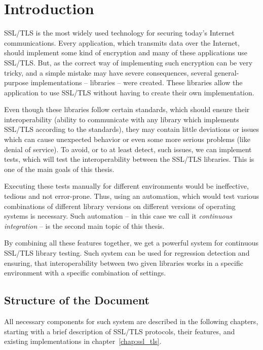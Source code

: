 
\chapter{Introduction}
    SSL/TLS is the most widely used technology for securing today's Internet communications.
    Every application, which transmits data over the Internet, should implement
    some kind of encryption and many of these applications use SSL/TLS. But, as
    the correct way of implementing such encryption can be very tricky, and
    a simple mistake may have severe consequences, several general-purpose
    implementations -- libraries -- were created. These libraries allow the
    application to use SSL/TLS without having to create their own implementation.

    Even though these libraries follow certain standards, which should ensure
    their interoperability (ability to communicate with any library which
    implements SSL/TLS according to the standards), they may contain little
    deviations or issues which can cause unexpected behavior or even some more
    serious problems (like denial of service). To avoid,
    or to at least detect, such issues, we can implement tests, which will test the
    interoperability between the SSL/TLS libraries. This is one of the main
    goals of this thesis.

    Executing these tests manually for different environments would be ineffective,
    tedious and not error-prone.
    Thus, using an automation, which would test various combinations of different
    library versions on different versions of operating systems is necessary.
    Such automation -- in this case we call it \textit{continuous integration} -- is
    the second main topic of this thesis.

    By combining all these features together, we get a powerful system for continuous
    SSL/TLS library testing. Such system can be used for regression detection
    and ensuring, that interoperability between two given libraries works in a specific
    environment with a specific combination of settings.

\section{Structure of the Document}
    All necessary components
    for such system are described in the following chapters, starting with a
    brief description of SSL/TLS protocols, their features, and existing
    implementations in chapter~\ref{chap:ssl_tls}.

